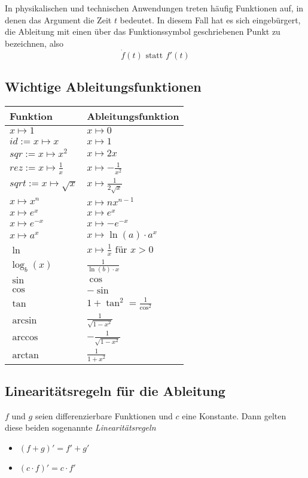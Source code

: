 \documentclass[10pt,a4paper]{article}
\begin{document}
In physikalischen und technischen Anwendungen treten häufig Funktionen auf, in denen das Argument die Zeit $t$ bedeutet. In diesem Fall hat es sich eingebürgert, die Ableitung mit einen über das Funktionssymbol geschriebenen Punkt zu bezeichnen, also
$$\dot{f}(t) \textrm{ statt } f'(t)$$


\subsection{Wichtige Ableitungsfunktionen}

\renewcommand{\arraystretch}{1.8}
\begin{longtable}{ll}
\hline
\textbf{Funktion} & \textbf{Ableitungsfunktion} \\\hline\endhead
$x \mapsto 1$ & $x \mapsto 0$ \\
$id := x \mapsto x$ & $x \mapsto 1$ \\
$sqr := x \mapsto x^2$ & $x \mapsto 2x$ \\
$rez := x \mapsto \frac{1}{x}$ & $x \mapsto -\frac{1}{x^2}$ \\
$sqrt := x \mapsto \sqrt{x}$ & $x \mapsto \frac{1}{2\sqrt{x}}$ \\
$x \mapsto x^n$ & $x \mapsto nx^{n-1}$ \\
$x \mapsto e^x$ & $x \mapsto e^x$ \\
$x \mapsto e^{-x}$ & $x \mapsto -e^{-x}$ \\
$x \mapsto a^x$ & $x \mapsto \ln(a) \cdot a^x$ \\
$\ln$ & $x \mapsto \frac{1}{x} \textrm{ für } x > 0$ \\
$\log_b(x)$ & $\frac{1}{\ln(b) \cdot x}$ \\
$\sin$ & $\cos$ \\
$\cos$ & $-\sin$ \\
$\tan$ & $1 + \tan^2 = \frac{1}{\cos^2}$ \\
$\arcsin$ & $\frac{1}{\sqrt{1 - x^2}}$ \\
$\arccos$ & $-\frac{1}{\sqrt{1 - x^2}}$ \\
$\arctan$ & $\frac{1}{1 + x^2}$ \\
\end{longtable}

\subsection{Linearitätsregeln für die Ableitung}

$f$ und $g$ seien differenzierbare Funktionen und $c$ eine Konstante. Dann gelten
diese beiden sogenannte \textit{Linearitätsregeln}
\begin{itemize}
	\item $(f + g)' = f' + g'$
	\item $(c \cdot f)' = c \cdot f'$
\end{itemize}
\end{document}
